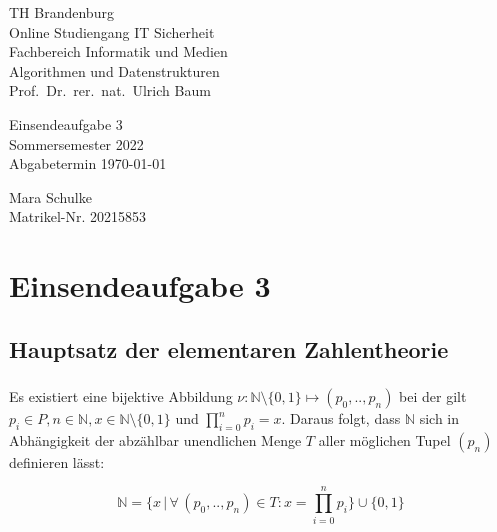 \documentclass{article}
\begin{document}
\begin{titlepage}
	\begin{flushleft}
		TH Brandenburg\\
		Online Studiengang IT Sicherheit\\
		Fachbereich Informatik und Medien\\
		Algorithmen und Datenstrukturen\\
		Prof.\ Dr.\ rer.\ nat.\ Ulrich Baum
	\end{flushleft}

	\vfill

	\begin{center}
		\Large{Einsendeaufgabe 3}\\[0.5em]
		\large{Sommersemester 2022}\\[0.25em]
		\large{Abgabetermin \today}
	\end{center}

	\vfill

	\begin{flushright}
		Mara Schulke \\
		Matrikel-Nr. 20215853
	\end{flushright}
\end{titlepage}

\newpage

\section*{Einsendeaufgabe 3}

\subsection{Hauptsatz der elementaren Zahlentheorie}

\subsubsection{}

Es existiert eine bijektive Abbildung $\nu: \mathbb{N} \setminus \{0,1\} \mapsto (p_0,..,p_n)$
bei der gilt $p_i \in P, n \in \mathbb{N}, x \in \mathbb{N} \setminus \{0,1\}$ und $\prod_{i=0}^{n} p_i = x$.
Daraus folgt, dass $\mathbb{N}$ sich in Abhängigkeit der abzählbar unendlichen
Menge $T$ aller möglichen Tupel $(p_n)$ definieren lässt:

\[\mathbb{N} = \{ x\,|\,\forall\,(p_0,..,p_n) \in T: x = \prod_{i=0}^{n} p_i  \} \cup \{0,1\}\]
\end{document}
